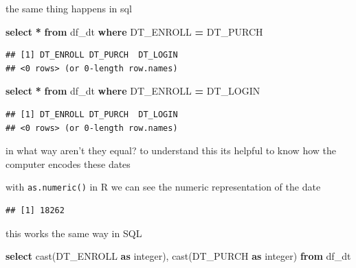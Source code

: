 \documentclass[
]{krantz}
\makeatletter
\newenvironment{Shaded}{\begin{snugshade}}{\end{snugshade}}
\newcommand{\DataTypeTok}[1]{\textcolor[rgb]{0.27,0.27,0.27}{#1}}
\newcommand{\FunctionTok}[1]{\textcolor[rgb]{0,0,0}{#1}}
\newcommand{\KeywordTok}[1]{\textcolor[rgb]{0.27,0.27,0.27}{\textbf{#1}}}
\newcommand{\NormalTok}[1]{#1}
\newcommand{\OperatorTok}[1]{\textcolor[rgb]{0.43,0.43,0.43}{\textbf{#1}}}
\newcommand{\SpecialCharTok}[1]{\textcolor[rgb]{0,0,0}{#1}}
\newenvironment{kframe}{%
\medskip{}
\setlength{\fboxsep}{.8em}
 \def\at@end@of@kframe{}%
 \ifinner\ifhmode%
  \def\at@end@of@kframe{\end{minipage}}%
  \begin{minipage}{\columnwidth}%
 \fi\fi%
 \def\FrameCommand##1{\hskip\@totalleftmargin \hskip-\fboxsep
 \colorbox{shadecolor}{##1}\hskip-\fboxsep
     \hskip-\linewidth \hskip-\@totalleftmargin \hskip\columnwidth}%
 \MakeFramed {\advance\hsize-\width
   \@totalleftmargin\z@ \linewidth\hsize
   \@setminipage}}%
 {\par\unskip\endMakeFramed%
 \at@end@of@kframe}
\renewenvironment{Shaded}{\begin{kframe}}{\end{kframe}}
\makeatother
\begin{document}
the same thing happens in sql

\begin{Shaded}
\begin{Highlighting}[]
\KeywordTok{select} \OperatorTok{*} \KeywordTok{from}\NormalTok{ df\_dt }\KeywordTok{where}\NormalTok{ DT\_ENROLL }\OperatorTok{=}\NormalTok{ DT\_PURCH}
\end{Highlighting}
\end{Shaded}

\begin{verbatim}
## [1] DT_ENROLL DT_PURCH  DT_LOGIN 
## <0 rows> (or 0-length row.names)
\end{verbatim}

\begin{Shaded}
\begin{Highlighting}[]
\KeywordTok{select} \OperatorTok{*} \KeywordTok{from}\NormalTok{ df\_dt }\KeywordTok{where}\NormalTok{ DT\_ENROLL }\OperatorTok{=}\NormalTok{ DT\_LOGIN}
\end{Highlighting}
\end{Shaded}

\begin{verbatim}
## [1] DT_ENROLL DT_PURCH  DT_LOGIN 
## <0 rows> (or 0-length row.names)
\end{verbatim}

in what way aren't they equal? to understand this its helpful to know how the computer encodes these dates

with \texttt{as.numeric()} in R we can see the numeric representation of the date

\begin{Shaded}
\end{Shaded}

\begin{verbatim}
## [1] 18262
\end{verbatim}

this works the same way in SQL

\begin{Shaded}
\begin{Highlighting}[]
\KeywordTok{select} \FunctionTok{cast}\NormalTok{(DT\_ENROLL }\KeywordTok{as} \DataTypeTok{integer}\NormalTok{), }\FunctionTok{cast}\NormalTok{(DT\_PURCH }\KeywordTok{as} \DataTypeTok{integer}\NormalTok{) }\KeywordTok{from}\NormalTok{ df\_dt}
\end{Highlighting}
\end{Shaded}
\end{document}
